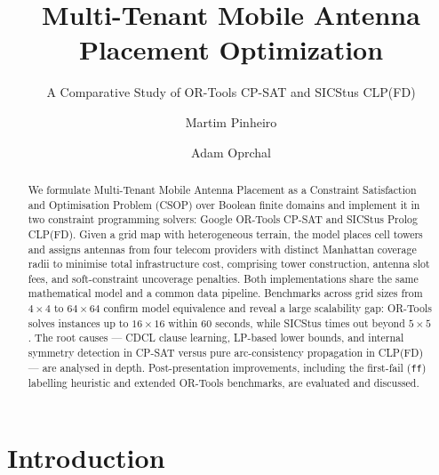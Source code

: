\documentclass{llncs}
\begin{document}
\title{Multi-Tenant Mobile Antenna Placement Optimization}
\subtitle{A Comparative Study of OR-Tools CP-SAT and SICStus CLP(FD)}

\author{Martim Pinheiro \and Adam Oprchal}


\maketitle

\begin{abstract}
We formulate Multi-Tenant Mobile Antenna Placement as a Constraint Satisfaction
and Optimisation Problem (CSOP) over Boolean finite domains and implement it in
two constraint programming solvers: Google OR-Tools CP-SAT and SICStus Prolog
CLP(FD). Given a grid map with heterogeneous terrain, the model places cell
towers and assigns antennas from four telecom providers with distinct Manhattan
coverage radii to minimise total infrastructure cost, comprising tower
construction, antenna slot fees, and soft-constraint uncoverage penalties.
Both implementations share the same mathematical model and a common data
pipeline. Benchmarks across grid sizes from $4{\times}4$ to $64{\times}64$
confirm model equivalence and reveal a large scalability gap: OR-Tools solves
instances up to $16{\times}16$ within 60 seconds, while SICStus times out
beyond $5{\times}5$. The root causes --- CDCL clause learning, LP-based lower
bounds, and internal symmetry detection in CP-SAT versus pure arc-consistency
propagation in CLP(FD) --- are analysed in depth. Post-presentation
improvements, including the first-fail (\texttt{ff}) labelling heuristic and
extended OR-Tools benchmarks, are evaluated and discussed.
\end{abstract}


\section{Introduction}
\label{sec:intro}
\end{document}
